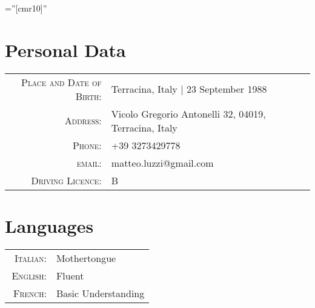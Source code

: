 \documentclass[a4paper,10pt]{article} %
\begin{document}
\pagestyle{empty} %

\font\fb=''[cmr10]'' %


\par{\bigskip\par} %

\section{Personal Data}

\begin{tabular}{rl}
\textsc{Place and Date of Birth:} & Terracina, Italy  | 23 September 1988 \\
\textsc{Address:} & Vicolo Gregorio Antonelli 32, 04019, Terracina, Italy \\
\textsc{Phone:} & +39 3273429778\\
\textsc{email:} & {matteo.luzzi@gmail.com}\\
\textsc{Driving Licence}: & B\\
\end{tabular}



\section{Languages}

\begin{tabular}{rl}
\
\textsc{Italian:} & Mothertongue\\

\textsc{English:} & Fluent\\

\textsc{French:} & Basic Understanding\\
\end{tabular}

\end{document}

